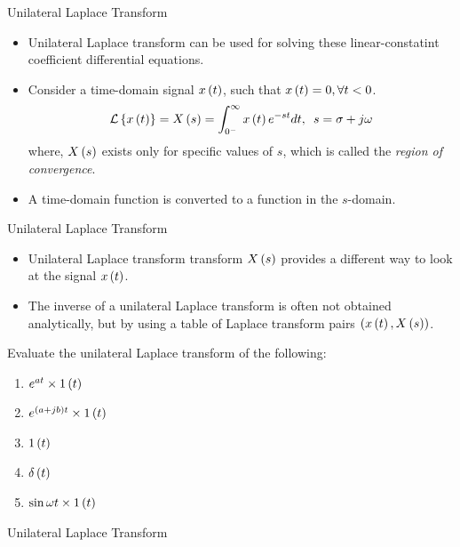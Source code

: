 \documentclass[aspectratio=169]{beamer}
\def\lp{\ensuremath\left(}
\def\rp{\ensuremath\right)}
\def\lc{\ensuremath\left\{}
\def\rc{\ensuremath\right\}}
\begin{document}
\begin{frame}[t]{Unilateral Laplace Transform}
\begin{itemize}
    \item Unilateral Laplace transform can be used for solving these linear-constatint coefficient differential equations.

    \item Consider a time-domain signal $x\lp t\rp$, such that $x\lp t\rp = 0, \forall t < 0$.    
    \[ \mathcal{L}\lc x\lp t\rp\rc = X\lp s\rp = \int_{0^-}^{\infty} x\lp t\rp e^{-st}dt, \,\,\, s = \sigma + j\omega \]
    where, $X\lp s\rp$ exists only for specific values of $s$, which is called the \textit{region of convergence}.

    \item A time-domain function is converted to a function in the $s$-domain. 

\end{itemize}
\end{frame}


\begin{frame}[t]{Unilateral Laplace Transform}
\begin{itemize}
    \item Unilateral Laplace transform transform $X\lp s\rp$ provides a different way to look at the signal $x\lp t\rp$.

    \item The inverse of a unilateral Laplace transform is often not obtained analytically, but by using a table of Laplace transform pairs $\lp x\lp t\rp, X\lp s\rp\rp$.

\end{itemize}
\vspace{0.5cm}

Evaluate the unilateral Laplace transform of the following:
\begin{enumerate}
    \item $e^{at} \times 1\lp t\rp$
    \item $e^{\lp a + jb\rp t} \times 1\lp t\rp$
    \item $1\lp t\rp$
    \item $\delta \lp t\rp$
    \item $\sin \omega t \times 1\lp t\rp$
\end{enumerate}
\end{frame}

\begin{frame}[t]{Unilateral Laplace Transform}
    
\end{frame}
\end{document}
